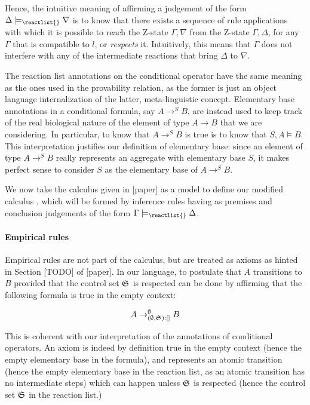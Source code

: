 Hence, the intuitive meaning of affirming a judgement of the form
$\Delta \models_{\reactlist{}} \nabla$ is to know that there exists a sequence
of \eznd{} rule applications with which it is possible to reach the Z-state
$\Gamma, \nabla$ from the Z-state $\Gamma, \Delta$, for any $\Gamma$ that is
compatible to $l$, or \emph{respects} it. Intuitively, this means that $\Gamma$
does not interfere with any of the intermediate reactions that bring $\Delta$ to
$\nabla$.

The reaction list annotations on the conditional operator have the same meaning
as the ones used in the provability relation, as the former is just an object
language internalization of the latter, meta-linguistic concept.  Elementary
base annotations in a conditional formula, say $A \rightarrow^S B$, are instead
used to keep track of the real biological nature of the element of type
$A \rightarrow B$ that we are considering.
In particular, to know that $A \rightarrow^S B$ is true is to know that $S, A
\models B$. This interpretation justifies our definition of elementary base:
since an element of type $A \rightarrow^S B$ really represents an aggregate with
elementary base $S$, it makes perfect sense to consider $S$ as the elementary
base of $A \rightarrow^S B$.

We now take the calculus \znd{} given in [paper] as a model to define our
modified calculus \eznd{}, which will be formed by inference rules having as
premises and conclusion judgements of the form
$\Gamma \models_{\reactlist{}} \Delta$.

\paragraph{Empirical rules}

Empirical rules are not part of the calculus, but are treated as axioms as
hinted in Section [TODO] of [paper]. In our language, to postulate that $A$
transitions to $B$ provided that the control set $\mathfrak{S}_{}$ is respected can
be done by affirming that the following formula is true in the empty context:

\[
  A \rightarrow_{(\emptyset, \mathfrak{S}_{}):[]}^\emptyset B
\]

This is coherent with our interpretation of the annotations of conditional
operators. An axiom is indeed by definition true in the empty context (hence the
empty elementary base in the formula), and represents an atomic transition
(hence the empty elementary base in the reaction list, as an atomic transition
has no intermediate steps) which can happen unless $\mathfrak{S}_{}$ is respected
(hence the control set $\mathfrak{S}_{}$ in the reaction list.)

